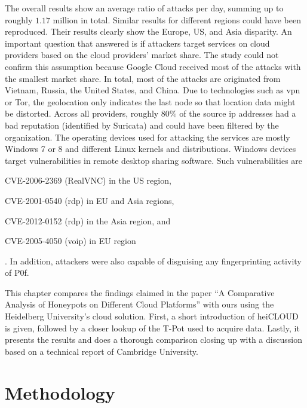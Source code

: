 The overall results show an average ratio of  attacks per day, summing up to roughly $1.17$ million in total.
Similar results for different regions could have been reproduced.
Their results clearly show the Europe, US, and Asia disparity.
An important question that \citet{Kelly2021} answered is if attackers target services on cloud providers based on the cloud providers' market share.
The study could not confirm this assumption because Google Cloud received most of the attacks with the smallest market share.
In total, most of the attacks are originated from Vietnam, Russia, the United States, and China.
Due to technologies such as \ac{vpn} or Tor, the geolocation only indicates the last node so that location data might be distorted.
Across all providers, roughly $80\%$ of the source \ac{ip} addresses had a bad reputation (identified by Suricata) and could have been filtered by the organization.
The operating devices used for attacking the services are mostly Windows 7 or 8 and different Linux kernels and distributions.
Windows devices target vulnerabilities in remote desktop sharing software.
Such vulnerabilities are
\begin{enumerate*}[label=(\roman*)]
    \item CVE-2006-2369\cite{CVE-2006-2369} (RealVNC) in the US region,
    \item CVE-2001-0540\cite{CVE-2001-0540} (\ac{rdp}) in EU and Asia regions,
    \item CVE-2012-0152\cite{CVE-2012-0152} (\ac{rdp}) in the Asia region, and
    \item CVE-2005-4050\cite{CVE-2005-4050} (\ac{voip}) in EU region
\end{enumerate*}.
In addition, attackers were also capable of disguising any fingerprinting activity of P0f.

This chapter compares the findings \citet{Kelly2021} claimed in the paper \enquote{A Comparative Analysis of Honeypots on Different Cloud Platforms} with ours using the Heidelberg University's cloud solution.
First, a short introduction of heiCLOUD is given, followed by a closer lookup of the T-Pot used to acquire data.
Lastly, it presents the results and does a thorough comparison closing up with a discussion based on a technical report of Cambridge University.

\section{Methodology}

